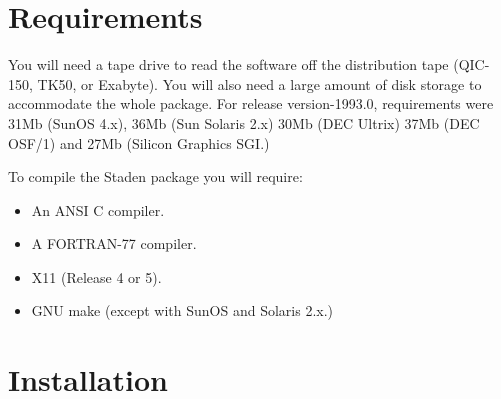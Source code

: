 \section{Requirements}

You will need a tape drive to read the software off the distribution
tape (QIC-150, TK50, or Exabyte). You will also need a large amount of
disk storage to accommodate the whole package. For release
version-1993.0, requirements were
31Mb (SunOS 4.x),
36Mb (Sun Solaris 2.x)
30Mb (DEC Ultrix)
37Mb (DEC OSF/1)
and
27Mb (Silicon Graphics SGI.)


To compile the Staden package you will require:
\begin{itemize}
\item An ANSI C compiler.
\item A FORTRAN-77 compiler.
\item X11 (Release 4 or 5).
\item GNU make (except with SunOS and Solaris 2.x.)
\end{itemize}

\section{Installation}

